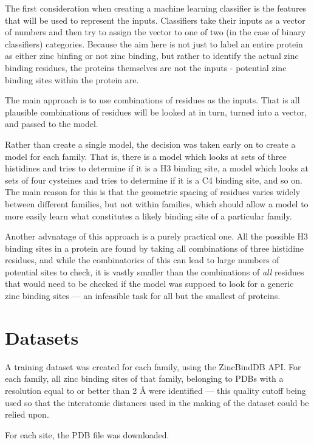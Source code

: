 The first consideration when creating a machine learning classifier is the features that will be used to represent the inputs. Classifiers take their inputs as a vector of numbers and then try to assign the vector to one of two (in the case of binary classifiers) categories. Because the aim here is not just to label an entire protein as either zinc binfing or not zinc binding, but rather to identify the actual zinc binding residues, the proteins themselves are not the inputs - potential zinc binding sites within the protein are.

The main approach is to use combinations of residues as the inputs. That is all plausible combinations of residues will be looked at in turn, turned into a vector, and passed to the model.

Rather than create a single model, the decision was taken early on to create a model for each family. That is, there is a model which looks at sets of three histidines and tries to determine if it is a H3 binding site, a model which looks at sets of four cysteines and tries to determine if it is a C4 binding site, and so on. The main reason for this is that the geometric spacing of residues varies widely between different families, but not within families, which should allow a model to more easily learn what constitutes a likely binding site of a particular family. 

Another advnatage of this approach is a purely practical one. All the possible H3 binding sites in a protein are found by taking all combinations of three histidine residues, and while the combinatorics of this can lead to large numbers of potential sites to check, it is vastly smaller than the combinations of \emph{all} residues that would need to be checked if the model was suppoed to look for a generic zinc binding sites --- an infeasible task for all but the smallest of proteins.

\section{Datasets}
A training dataset was created for each family, using the ZincBindDB API. For each family, all zinc binding sites of that family, belonging to PDBs with a resolution equal to or better than 2 {\AA} were identified --- this quality cutoff being used so that the interatomic distances used in the making of the dataset could be relied upon.

For each site, the PDB file was downloaded.


